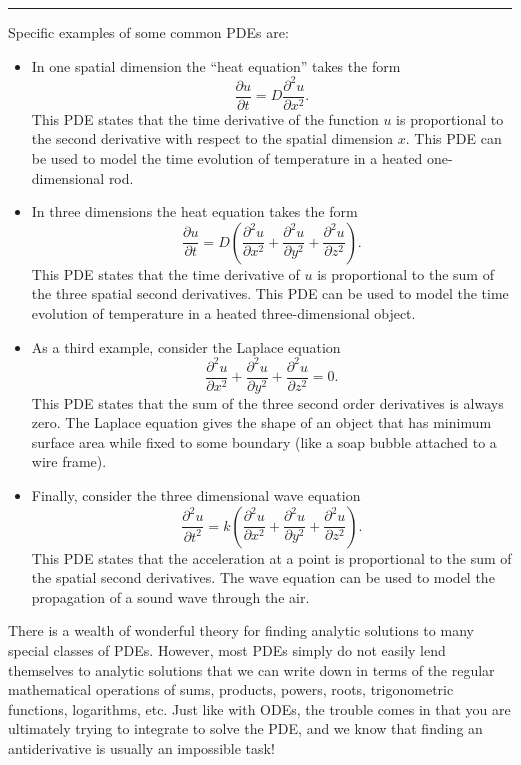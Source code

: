 \documentclass[
]{book}
\providecommand{\tightlist}{%
  \setlength{\itemsep}{0pt}\setlength{\parskip}{0pt}}
\theoremstyle{definition}
\theoremstyle{definition}
\theoremstyle{definition}
\theoremstyle{remark}
\begin{document}
\begin{center}\rule{0.5\linewidth}{0.5pt}\end{center}

Specific examples of some common PDEs are:

\begin{itemize}
\tightlist
\item
  In one spatial dimension the ``heat equation'' takes the form
  \[ \frac{\partial u}{\partial t} = D \frac{\partial^2 u}{\partial x^2}.  \]
  This PDE states that the time derivative of the function \(u\) is proportional to the second derivative with respect to the spatial dimension \(x\). This PDE can be used to model the time evolution of temperature in a heated one-dimensional rod.
\item
  In three dimensions the heat equation takes the form
  \[ \frac{\partial u}{\partial t} = D\left( \frac{\partial^2 u}{\partial x^2} + \frac{\partial^2 u}{\partial y^2} + \frac{\partial^2 u}{\partial z^2}  \right). \]
  This PDE states that the time derivative of \(u\) is proportional to the sum of the three spatial second derivatives. This PDE can be used to model the time evolution of temperature in a heated three-dimensional object.
\item
  As a third example, consider the Laplace equation
  \[ \frac{\partial^2 u}{\partial x^2} + \frac{\partial^2 u}{\partial y^2} + \frac{\partial^2 u}{\partial z^2} = 0. \]
  This PDE states that the sum of the three second order derivatives is always zero. The Laplace equation gives the shape of an object that has minimum surface area while fixed to some boundary (like a soap bubble attached to a wire frame).\\
\item
  Finally, consider the three dimensional wave equation
  \[ \frac{\partial^2 u}{\partial t^2} = k\left( \frac{\partial^2 u}{\partial x^2} + \frac{\partial^2 u}{\partial y^2}+ \frac{\partial^2 u}{\partial z^2} \right). \]
  This PDE states that the acceleration at a point is proportional to the sum of the spatial second derivatives. The wave equation can be used to model the propagation of a sound wave through the air.
\end{itemize}

There is a wealth of wonderful theory for finding analytic solutions to many special classes of PDEs. However, most PDEs simply do not easily lend themselves to analytic solutions that we can write down in terms of the regular mathematical operations of sums, products, powers, roots, trigonometric functions, logarithms, etc. Just like with ODEs, the trouble comes in that you are ultimately trying to integrate to solve the PDE, and we know that finding an antiderivative is usually an impossible task!
\end{document}
